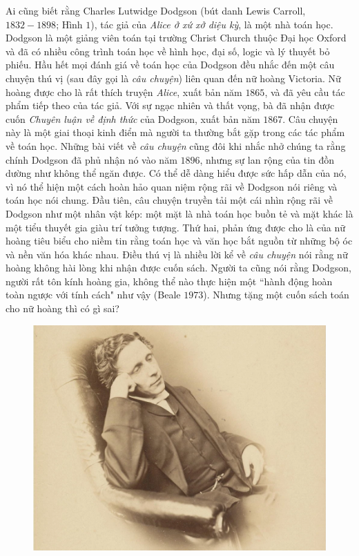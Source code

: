 \begin{multicols}{2}
	Ai cũng biết rằng Charles Lutwidge Dodgson (bút danh Lewis Carroll, $1832-1898$; Hình $1$), tác giả của \textit{Alice ở xứ xở diệu kỳ}, là một nhà toán học. Dodgson là một giảng viên toán tại trường Christ Church thuộc Đại học Oxford và đã có nhiều công trình toán học về hình học, đại số, logic và lý thuyết bỏ phiếu. Hầu hết mọi đánh giá về toán học của Dodgson đều nhắc đến một câu chuyện thú vị (sau đây gọi là \textit{câu chuyện}) liên quan đến nữ hoàng Victoria. Nữ hoàng được cho là rất thích truyện \textit{Alice}, xuất bản năm $1865$, và đã yêu cầu tác phẩm tiếp theo của tác giả. Với sự ngạc nhiên và thất vọng, bà đã nhận được cuốn \textit{Chuyên luận về định thức} của Dodgson, xuất bản năm $1867$. Câu chuyện này là một giai thoại kinh điển mà người ta thường bắt gặp trong các tác phẩm về toán học.
	\vskip 0.02cm
	Những bài viết về \textit{câu chuyện} cũng đôi khi nhắc nhở chúng ta rằng chính Dodgson đã phủ nhận nó vào năm $1896$, nhưng sự lan rộng của tin đồn dường như không thể ngăn được. Có thể dễ dàng hiểu được sức hấp dẫn của nó, vì nó thể hiện một cách hoàn hảo quan niệm rộng rãi về Dodgson nói riêng và toán học nói chung. Đầu tiên, câu chuyện truyền tải một cái nhìn rộng rãi về Dodgson như một nhân vật kép: một mặt là nhà toán học buồn tẻ và mặt khác là một tiểu thuyết gia giàu trí tưởng tượng. Thứ hai, phản ứng được cho là của nữ hoàng tiêu biểu cho niềm tin rằng toán học và văn học bắt nguồn từ những bộ óc và nền văn hóa khác nhau. Điều thú vị là nhiều lời kể về \textit{câu chuyện} nói rằng nữ hoàng không hài lòng khi nhận được cuốn sách. Người ta cũng nói rằng Dodgson, người rất tôn kính hoàng gia, không thể nào thực hiện một ``hành động hoàn toàn ngược với tính cách" như vậy (Beale $1973$). Nhưng  tặng một cuốn sách toán cho nữ hoàng thì có gì sai?  
	\begin{figure}[H]
		\vspace*{-5pt}
		\centering
		\captionsetup{labelformat= empty, justification=centering}
		\includegraphics[width= 1\linewidth]{1}

\end{figure}
\end{multicols}
